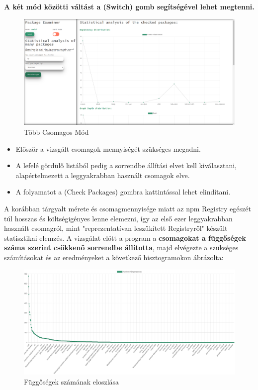 \textbf{A két mód közötti váltást a (Switch) gomb segítségével lehet megtenni.}

\begin{figure}[!h]
	\centering
	\includegraphics[scale=0.2]{images/statistics.png}
	\caption{Több Csomagos Mód}
	\label{fig:examiner}
\end{figure}

\begin{itemize}
	\item Először a vizsgált csomagok mennyiségét szükséges megadni.
	\item A lefelé gördülő listából pedig a sorrendbe állítási elvet kell kiválasztani, alapértelmezett a leggyakrabban használt csomagok elve.
	\item A folyamatot a (Check Packages) gombra kattintással lehet elindítani.
\end{itemize}


A korábban tárgyalt mérete és csomagmennyisége miatt az npm Registry egészét túl hosszas és költségigényes lenne elemezni, így az első ezer leggyakrabban használt csomagról, mint "reprezentatívan leszűkített Registryről" készült statisztikai elemzés. A vizsgálat előtt a program a \textbf{csomagokat a függőségek száma szerint csökkenő sorrendbe állította}, majd elvégezte a szükséges számításokat és az eredményeket a következő hisztogramokon ábrázolta:

\begin{figure}[!h]
	\centering
	\includegraphics[scale=0.12]{images/depdist.png}
	\caption{Függőségek számának eloszlása}
	\label{fig:depdist}
\end{figure}  

